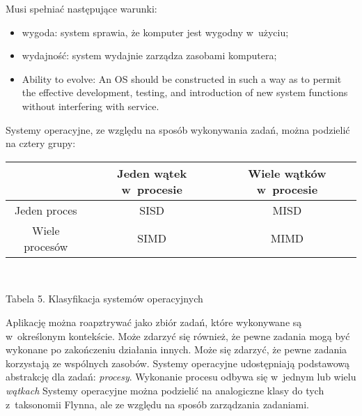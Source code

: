 \documentclass{mwart}
\begin{document}
	Musi spełniać następujące warunki:
	\begin{itemize}
		\item wygoda: system sprawia, że komputer jest wygodny w~użyciu; %
		\item wydajność: system wydajnie zarządza zasobami komputera; %
		\item Ability to evolve: An OS should be constructed in such a way as to permit the
      effective development, testing, and introduction of new system functions without interfering with service.
	\end{itemize}
\par
%
\indent
	Systemy operacyjne, ze względu na sposób wykonywania zadań, można podzielić na cztery grupy:
	\begin{center}
	\begin{tabular}{|c|c|c|} \hline
													 & Jeden wątek w~procesie   	 & Wiele wątków w~procesie \\\hline
			Jeden proces               &  SISD										   & MISD 			\\\hline
			Wiele procesów             & SIMD                        & MIMD \\\hline
	\end{tabular}\\
	\begin{small} Tabela 5. Klasyfikacja systemów operacyjnych \end{small}
	\end{center}
\par
%
\indent
	Aplikację można roapztrywać jako zbiór zadań, które wykonywane są w~określonym kontekście. Może zdarzyć się również, że pewne zadania
	mogą być wykonane po zakończeniu działania innych. Może się zdarzyć, że pewne zadania korzystają ze wspólnych zasobów.
	Systemy operacyjne udostępniają podstawową abstrakcję dla zadań: \emph{procesy}. Wykonanie procesu odbywa się w~jednym lub wielu \emph{wątkach}
	Systemy operacyjne można podzielić na analogiczne klasy do tych z~taksonomii Flynna, ale ze względu na sposób zarządzania zadaniami.
\par
%
\end{document}

